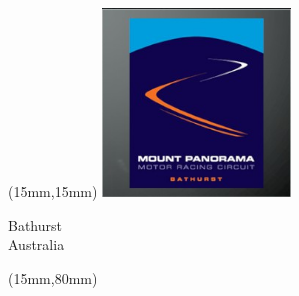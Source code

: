 \begin{textblock*}{50mm}(15mm,15mm)%
\includegraphics[width=50mm]{LG/2015-05-20_00087.png}
\par Bathurst\\ Australia
\end{textblock*}
\begin{textblock*}{185mm}(15mm,80mm)%
\end{textblock*}
